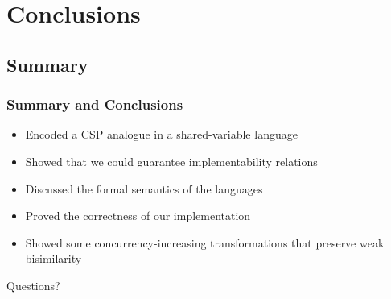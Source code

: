 \documentclass[compress]{beamer}
\begin{document}
\section{Conclusions}
\subsection{Summary}
\begin{frame}
\frametitle{Summary and Conclusions}
\begin{itemize}
\item Encoded a CSP analogue in a shared-variable language
\pause
\item Showed that we could guarantee implementability relations
\pause
\item Discussed the formal semantics of the languages
\pause
\item Proved the correctness of our implementation
\pause
\item Showed some concurrency-increasing transformations that preserve weak bisimilarity
\end{itemize}
\end{frame}
\begin{frame}[plain]
\begin{center}
\Huge Questions?
\end{center}
\end{frame}
\end{document}
